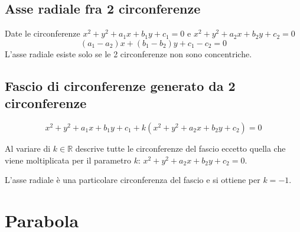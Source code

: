\documentclass{article}
\begin{document}
  \subsection*{Asse radiale fra 2 circonferenze}
  Date le circonferenze $x^2+y^2+a_1x+b_1y+c_1 = 0$ e $x^2+y^2+a_2x+b_2y+c_2 = 0$ 
  \begin{equation}
    (a_1-a_2)x+(b_1-b_2)y+c_1-c_2 = 0
  \end{equation}
  L'asse radiale esiste solo se le 2 circonferenze non sono concentriche.

  \subsection*{Fascio di circonferenze generato da 2 circonferenze}
  \begin{equation}
    x^2+y^2+a_1x+b_1y+c_1 +k (x^2+y^2+a_2x+b_2y+c_2) = 0
  \end{equation}

  Al variare di $k \in \mathbb{R}$ descrive tutte le circonferenze del fascio eccetto quella che viene moltiplicata per il parametro $k$: $x^2+y^2+a_2x+b_2y+c_2 = 0$.

  L'asse radiale è una particolare circonferenza del fascio e si ottiene per $k=-1$.

  \newpage
  \section{Parabola}
\end{document}
